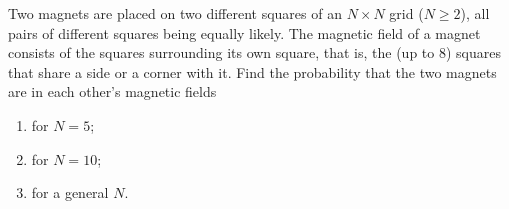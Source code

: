 Two magnets are placed on two different squares of an $N\times N$ grid ($N\ge2$), all pairs of different squares being equally likely. The magnetic field of a magnet consists of the squares surrounding its own square, that is, the (up to $8$) squares that share a side or a corner with it. Find the probability that the two magnets are in each other's magnetic fields
\begin{enumerate}
\item[(a)] for $N=5$;
\item[(b)] for $N=10$;
\item[(c)] for a general $N$.
\end{enumerate}
